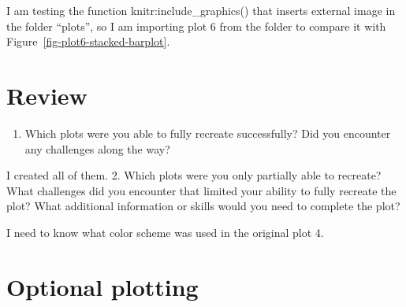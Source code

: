 \documentclass[
  man,
  floatsintext,
  longtable,
  nolmodern,
  notxfonts,
  notimes,
  colorlinks=true,linkcolor=blue,citecolor=blue,urlcolor=blue]{apa7}
\providecommand{\tightlist}{%
  \setlength{\itemsep}{0pt}\setlength{\parskip}{0pt}}
\begin{document}
I am testing the function knitr:include\_graphics() that inserts
external image in the folder ``plots'', so I am importing plot 6 from
the folder to compare it with Figure~\ref{fig-plot6-stacked-barplot}.

\begin{figure}

\caption{\label{fig-plot6-for-comparison}}


\end{figure}%

\section{Review}\label{review}

\begin{enumerate}
\def\labelenumi{\arabic{enumi}.}
\tightlist
\item
  Which plots were you able to fully recreate successfully? Did you
  encounter any challenges along the way?
\end{enumerate}

I created all of them. 2. Which plots were you only partially able to
recreate? What challenges did you encounter that limited your ability to
fully recreate the plot? What additional information or skills would you
need to complete the plot?

I need to know what color scheme was used in the original plot 4.

\section{Optional plotting}\label{optional-plotting}
\end{document}
